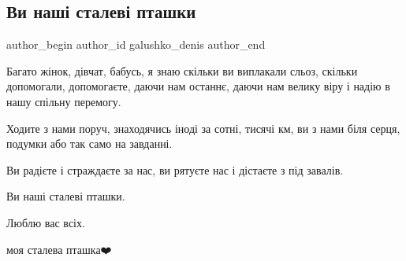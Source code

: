  
 
 
 
 

\subsection{Ви наші сталеві пташки}
\label{sec:27_11_2022.fb.galushko_denis.1.vi_nash__stalev__pta}

\ifcmt
 author_begin
   author_id galushko_denis
 author_end
\fi

Багато жінок, дівчат, бабусь, я знаю скільки ви виплакали сльоз, скільки
допомогали, допомогаєте, даючи нам останнє, даючи нам велику віру і надію в
нашу спільну перемогу.

Ходите з нами поруч, знаходячись іноді за сотні, тисячі км, ви з нами біля
серця, подумки або так само на завданні.

Ви радієте і страждаєте за нас, ви рятуєте нас і дістаєте з під завалів.  

Ви наші сталеві пташки. 

Люблю вас всіх.

моя сталева пташка❤️
